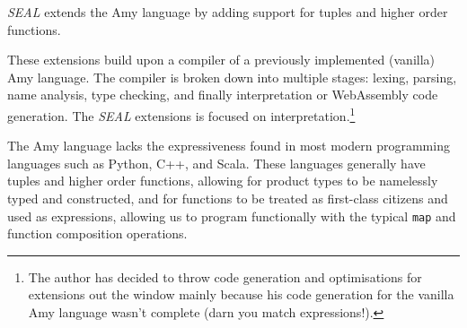 \textit{SEAL} extends the Amy language by adding support for tuples and higher order functions. 

These extensions build upon a compiler of a previously implemented (vanilla) Amy language. The compiler is broken down into multiple stages: lexing, parsing, name analysis, type checking, and finally interpretation or WebAssembly code generation. The \textit{SEAL} extensions is focused on interpretation.\footnote{The author has decided to throw code generation and optimisations for extensions out the window mainly because his code generation for the vanilla Amy language wasn't complete (darn you match expressions!). }

The Amy language lacks the expressiveness found in most modern programming languages such as Python, C++, and Scala. These languages generally have tuples and higher order functions, allowing for product types to be namelessly typed and constructed, and for functions to be treated as first-class citizens and used as expressions, allowing us to program functionally with the typical \texttt{map} and function composition operations.
